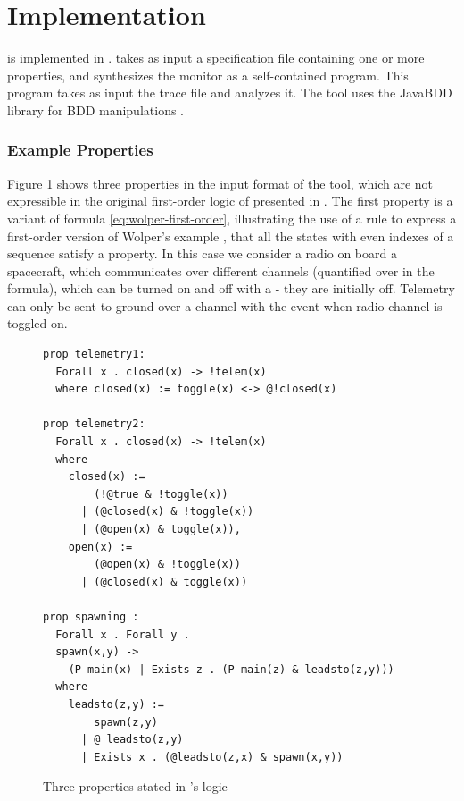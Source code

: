 
\section{Implementation}

\dejavu{} is implemented in \scalalang{}.   
\dejavu{} takes as input a specification file containing one  or 
more  properties, and synthesizes the monitor as a self-contained \scalalang{} 
program.
This program takes as input the 
trace file and analyzes it.
The tool uses the JavaBDD library for BDD manipulations \cite{javabdd}.

\subsubsection{Example Properties}

Figure \ref{fig:properties} shows three properties in the 
input format of the tool, which are not expressible in the original first-order logic of \dejavu{} presented in \cite{HPU}. The first property  is a variant of
formula \ref{eq:wolper-first-order}, illustrating the use of a 
rule to express a first-order version of Wolper's example \cite{Wolper}, that all the states with even indexes of a sequence satisfy a property.
In this case we consider a radio on board a spacecraft, which communicates over different channels (quantified over in the formula), which can be turned on and off with a  - they are initially off.
Telemetry can only be sent to ground over a channel  with the  event when radio channel  is toggled on.

\begin{center}
\begin{figure}
\begin{lstlisting}[language=dsl,frame=single,linewidth=0.95\textwidth,backgroundcolor=\color{white},linewidth=\columnwidth,breaklines=true,basicstyle=\small]
prop telemetry1: 
  Forall x . closed(x) -> !telem(x)
  where closed(x) := toggle(x) <-> @!closed(x)

prop telemetry2: 
  Forall x . closed(x) -> !telem(x)
  where
    closed(x) :=
        (!@true & !toggle(x))
      | (@closed(x) & !toggle(x))
      | (@open(x) & toggle(x)),
    open(x) :=
        (@open(x) & !toggle(x))
      | (@closed(x) & toggle(x))

prop spawning : 
  Forall x . Forall y .
  spawn(x,y) -> 
    (P main(x) | Exists z . (P main(z) & leadsto(z,y)))
  where
    leadsto(z,y) := 
        spawn(z,y) 
      | @ leadsto(z,y) 
      | Exists x . (@leadsto(z,x) & spawn(x,y))
\end{lstlisting}
\caption{Three properties stated in \dejavu's logic}
\label{fig:properties}
\end{figure}
\end{center}

